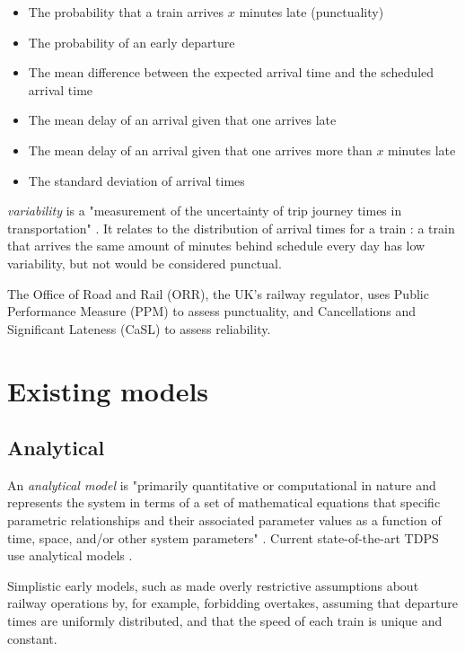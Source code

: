 \documentclass{article}
\begin{document}
\begin{itemize}
	\item The probability that a train arrives $x$ minutes late (punctuality)
	\item The probability of an early departure
	\item The mean difference between the expected arrival time and the scheduled arrival time
	\item The mean delay of an arrival given that one arrives late
	\item The mean delay of an arrival given that one arrives more than $x$ minutes late
	\item The standard deviation of arrival times
\end{itemize}

\textit{variability} is a "measurement of the uncertainty of trip journey times in transportation" \cite{olsson_haugland_2004}. It relates to the distribution of arrival times for a train \cite{noland_polak_2002}:
a train that arrives the same amount of minutes behind schedule every day has low variability, but not would be considered punctual.

The Office of Road and Rail (ORR), the UK's railway regulator, uses Public Performance Measure (PPM) to assess punctuality, and Cancellations and Significant Lateness (CaSL) to assess reliability.

\section{Existing models}

\subsection{Analytical}

An \textit{analytical model} is "primarily quantitative or computational in nature and represents the system in terms of a set of mathematical equations that specific parametric relationships and their associated
parameter values as a function of time, space, and/or other system parameters" \cite{friedenthal_moore_steiner_2012}. Current state-of-the-art TDPS use analytical models \cite{oneto_fumeo_clerico_canepa_papa_dambra_mazzino_anguita_2016}.

Simplistic early models, such as \cite{frank_1966} made overly restrictive assumptions about railway operations by, for example, forbidding overtakes, assuming that departure times are uniformly distributed,
and that the speed of each train is unique and constant. 
\end{document}
